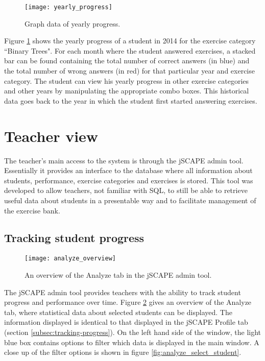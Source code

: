 \begin{figure}[H]
\centering
\texttt{[image: yearly\_progress]}
\caption{Graph data of yearly progress.}
\label{fig:yearly_progress}
\end{figure}

Figure \ref{fig:yearly_progress} shows the yearly progress of a student in 2014 for the exercise category ``Binary Trees". For each month where the student answered exercises, a stacked bar can be found containing the total number of correct answers (in blue) and the total number of wrong answers (in red) for that particular year and exercise category. The student can view his yearly progress in other exercise categories and other years by manipulating the appropriate combo boxes. This historical data goes back to the year in which the student first started answering exercises.

\section{Teacher view}
The teacher's main access to the system is through the jSCAPE admin tool. Essentially it provides an interface to the database where all information about students, performance, exercise categories and exercises is stored. This tool was developed to allow teachers, not familiar with SQL, to still be able to retrieve useful data about students in a presentable way and to facilitate management of the exercise bank.

\subsection{Tracking student progress}
\begin{figure}[H]
\centering
\texttt{[image: analyze\_overview]}
\caption{An overview of the Analyze tab in the jSCAPE admin tool.}
\label{fig:analyze_overview}
\end{figure}

The jSCAPE admin tool provides teachers with the ability to track student progress and performance over time. Figure \ref{fig:analyze_overview} gives an overview of the Analyze tab, where statistical data about selected students can be displayed. The information displayed is identical to that displayed in the jSCAPE Profile tab (section \ref{subsec:tracking-progress}). On the left hand side of the window, the light blue box contains options to filter which data is displayed in the main window. A close up of the filter options is shown in figure \ref{fig:analyze_select_student}.

